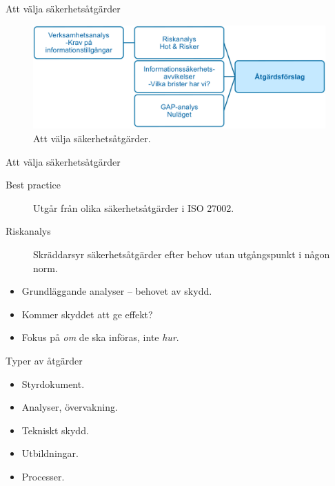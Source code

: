 \documentclass{beamer}
\begin{document}
\begin{frame}{Att välja säkerhetsåtgärder}
  \begin{figure}
    \includegraphics[width=\textwidth]{msb-atgarder.png}
    \caption{Att välja säkerhetsåtgärder.}
  \end{figure}
\end{frame}

\begin{frame}{Att välja säkerhetsåtgärder}
  \begin{description}
    \item[Best practice] Utgår från olika säkerhetsåtgärder i ISO 27002.
    \item[Riskanalys] Skräddarsyr säkerhetsåtgärder efter behov utan 
      utgångspunkt i någon norm.
  \end{description}
  \begin{itemize}
    \item Grundläggande analyser -- behovet av skydd.
    \item Kommer skyddet att ge effekt?
    \item Fokus på \emph{om} de ska införas, inte \emph{hur}.
  \end{itemize}
\end{frame}
\begin{frame}{Typer av åtgärder}
  \begin{itemize}
    \item Styrdokument.
    \item Analyser, övervakning.
    \item Tekniskt skydd.
    \item Utbildningar.
    \item Processer.
  \end{itemize}
\end{frame}
\end{document}
